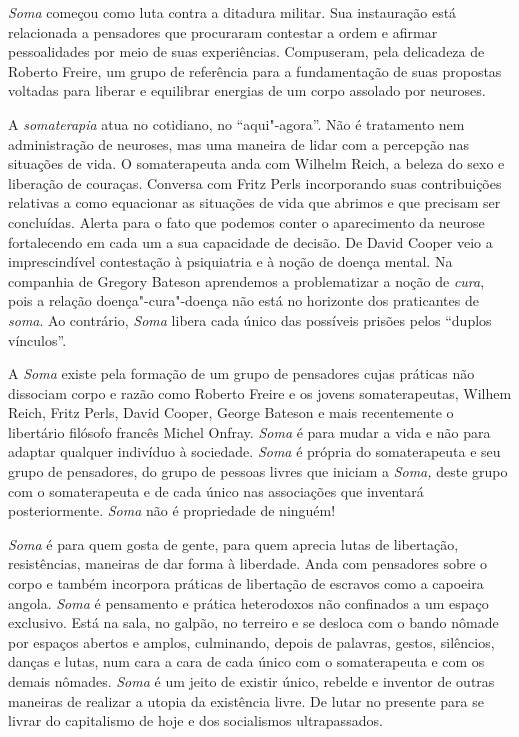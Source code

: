 \emph{Soma} começou como luta contra a ditadura militar. Sua instauração
está relacionada a pensadores que procuraram contestar a ordem e afirmar
pessoalidades por meio de suas experiências. Compuseram, pela delicadeza
de Roberto Freire, um grupo de referência para a fundamentação de suas
propostas voltadas para liberar e equilibrar energias de um corpo
assolado por neuroses.

A \emph{somaterapia} atua no cotidiano, no ``aqui"-agora''. Não é
tratamento nem administração de neuroses, mas uma maneira de lidar com a
percepção nas situações de vida. O somaterapeuta anda com Wilhelm Reich,
a beleza do sexo e liberação de couraças. Conversa com Fritz Perls
incorporando suas contribuições relativas a como equacionar as situações
de vida que abrimos e que precisam ser concluídas. Alerta para o fato
que podemos conter o aparecimento da neurose fortalecendo em cada um a
sua capacidade de decisão. De David Cooper veio a imprescindível
contestação à psiquiatria e à noção de doença mental. Na companhia de
Gregory Bateson aprendemos a problematizar a noção de \emph{cura}, pois
a relação doença"-cura"-doença não está no horizonte dos praticantes de
\emph{soma}. Ao contrário, \emph{Soma} libera cada único das possíveis
prisões pelos ``duplos vínculos''.

A \emph{Soma} existe pela formação de um grupo de pensadores cujas
práticas não dissociam corpo e razão como Roberto Freire e os jovens
somaterapeutas, Wilhem Reich, Fritz Perls, David Cooper, George Bateson
e mais recentemente o libertário filósofo francês Michel Onfray.
\emph{Soma} é para mudar a vida e não para adaptar qualquer indivíduo à
sociedade. \emph{Soma} é própria do somaterapeuta e seu grupo de
pensadores, do grupo de pessoas livres que iniciam a \emph{Soma,} deste
grupo com o somaterapeuta e de cada único nas associações que inventará
posteriormente. \emph{Soma} não é propriedade de ninguém!

\emph{Soma} é para quem gosta de gente, para quem aprecia lutas de
libertação, resistências, maneiras de dar forma à liberdade. Anda com
pensadores sobre o corpo e também incorpora práticas de libertação de
escravos como a capoeira angola. \emph{Soma} é pensamento e prática
heterodoxos não confinados a um espaço exclusivo. Está na sala, no
galpão, no terreiro e se desloca com o bando nômade por espaços abertos
e amplos, culminando, depois de palavras, gestos, silêncios, danças e
lutas, num cara a cara de cada único com o somaterapeuta e com os demais
nômades. \emph{Soma} é um jeito de existir único, rebelde e inventor de
outras maneiras de realizar a utopia da existência livre. De lutar no
presente para se livrar do capitalismo de hoje e dos socialismos
ultrapassados.

